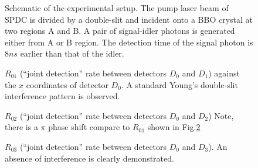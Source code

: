 \begin{figure}[tbp]
\centerline{\epsfxsize=2.7in } \caption{Schematic of the
experimental setup. The pump laser beam of SPDC is divided by a double-slit and incident
onto a BBO crystal at two regions A and B. A pair of signal-idler photons is generated
either from A or B region. The detection time of the signal photon is $8ns$ earlier than
that of the idler.}\label{fig:figure2}
\end{figure}

\begin{figure}[tbp]
\centerline{\epsfxsize=2.7in }
\caption{$R_{01}$ (``joint detection'' rate between detectors $D_{0}$ and $%
D_{1}$) against the $x$ coordinates of detector $D_{0}$. A standard Young's double-slit
interference pattern is observed.}\label{fig:figure3}
\end{figure}

\begin{figure}[tbp]
\centerline{\epsfxsize=2.7in }
\caption{$R_{02}$ (``joint detection'' rate between detectors $D_{0}$ and $%
D_{2}$) Note, there is a $\pi$ phase shift compare to $R_{01}$ shown in
Fig.\ref{fig:figure3} }\label{fig:figure4}
\end{figure}

\begin{figure}[tbp]
\centerline{\epsfxsize=2.7in }
\caption{$R_{03}$ (``joint detection'' rate between detectors $D_{0}$ and $%
D_{3}$). An absence of interference is clearly demonstrated.}\label{fig:figure5}
\end{figure}


